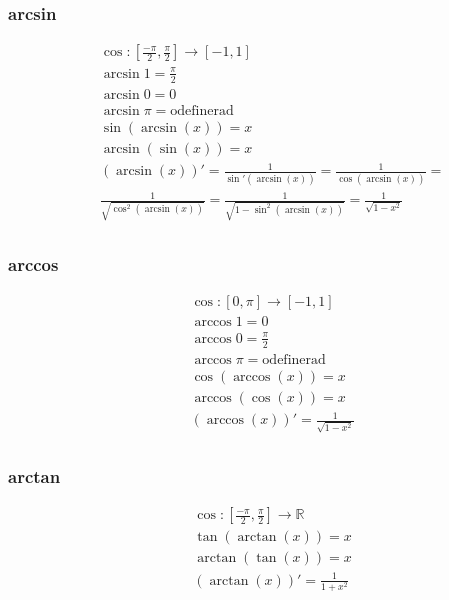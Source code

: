\subsubsection{arcsin}
\begin{align*}
  &\quad  \cos: [\frac{-\pi}{2},\frac{\pi}{2}] \to [-1,1] \\
  &\quad  \arcsin{1}=\frac{\pi}{2} \\
  &\quad  \arcsin{0}=0 \\
  &\quad  \arcsin{\pi}=\text{odefinerad} \\
  &\quad  \sin(\arcsin(x))=x \\  
  &\quad  \arcsin(\sin(x))=x \\
  &\quad  (\arcsin(x))'=\frac{1}{\sin'(\arcsin(x))}=\frac{1}{\cos(\arcsin(x))}= \\
  &\quad  \frac{1}{\sqrt{\cos^2(\arcsin(x))}}=\frac{1}{\sqrt{1-\sin^2(\arcsin(x))}}=\frac{1}{\sqrt{1-x^2}} \\
\end{align*}

\subsubsection{arccos}
\begin{align*}
  &\quad  \cos: [0,\pi] \to [-1,1] \\
  &\quad  \arccos{1}=0 \\
  &\quad  \arccos{0}=\frac{\pi}{2} \\
  &\quad  \arccos{\pi}=\text{odefinerad} \\
  &\quad  \cos(\arccos(x))=x \\  
  &\quad  \arccos(\cos(x))=x \\
  &\quad  (\arccos(x))'= \frac{1}{\sqrt{1-x^2}} \\
\end{align*}

\subsubsection{arctan}
\begin{align*}
  &\quad  \cos: [\frac{-\pi}{2},\frac{\pi}{2}] \to \mathbb{R} \\
  &\quad  \tan(\arctan(x))=x \\  
  &\quad  \arctan(\tan(x))=x \\
  &\quad  (\arctan(x))'= \frac{1}{1+x^2} \\
\end{align*}

